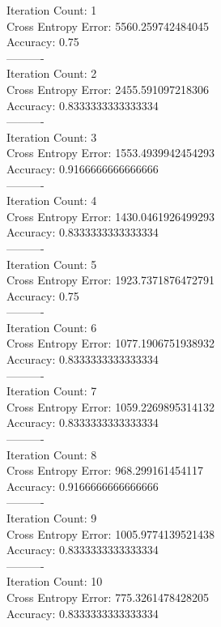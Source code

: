\documentclass[11pt]{article}
\begin{document}
\begin{multicols}{2}
Iteration Count: 1 \\
Cross Entropy Error: 5560.259742484045 \\
Accuracy: 0.75 \\
----------  \\
Iteration Count: 2 \\
Cross Entropy Error: 2455.591097218306 \\
Accuracy: 0.8333333333333334 \\
---------- \\
Iteration Count: 3 \\
Cross Entropy Error: 1553.4939942454293\\
Accuracy: 0.9166666666666666\\
----------\\
Iteration Count: 4\\
Cross Entropy Error: 1430.0461926499293\\
Accuracy: 0.8333333333333334\\
----------\\
Iteration Count: 5\\
Cross Entropy Error: 1923.7371876472791\\
Accuracy: 0.75\\
----------\\
Iteration Count: 6\\
Cross Entropy Error: 1077.1906751938932\\
Accuracy: 0.8333333333333334\\
----------\\
Iteration Count: 7\\
Cross Entropy Error: 1059.2269895314132\\
Accuracy: 0.8333333333333334\\
----------\\
Iteration Count: 8\\
Cross Entropy Error: 968.299161454117\\
Accuracy: 0.9166666666666666\\
----------\\
Iteration Count: 9\\
Cross Entropy Error: 1005.9774139521438\\
Accuracy: 0.8333333333333334\\
----------\\
Iteration Count: 10\\
Cross Entropy Error: 775.3261478428205\\
Accuracy: 0.8333333333333334\\

\end{multicols}
\end{document}
